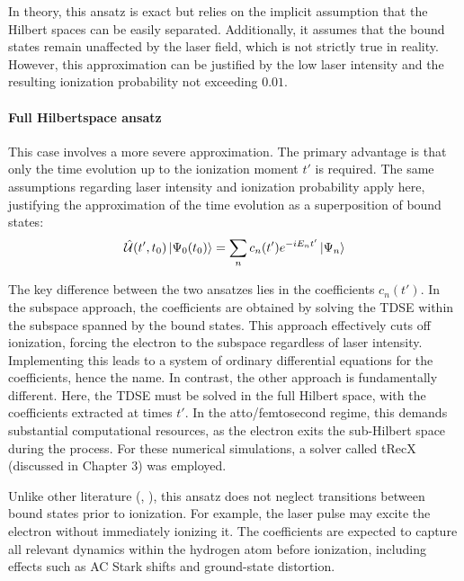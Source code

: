 In theory, this ansatz is exact but relies on the implicit assumption that the Hilbert spaces can be easily separated.
Additionally, it assumes that the bound states remain unaffected by the laser field, which is not strictly true in reality.
However, this approximation can be justified by the low laser intensity and the resulting ionization probability not exceeding $0.01$.

\paragraph{Full Hilbertspace ansatz}
This case involves a more severe approximation.
The primary advantage is that only the time evolution up to the ionization moment $t'$ is required.
The same assumptions regarding laser intensity and ionization probability apply here, justifying the approximation of the time evolution as a superposition of bound states:
\begin{equation*}
    \hat{\mathcal{U}}(t',t_0)\ket{\Psi_0(t_0)} = \sum_{n}c_n(t')e^{-iE_nt'}\ket{\Psi_n}
\end{equation*}

\bigskip

The key difference between the two ansatzes lies in the coefficients $c_n(t')$.
In the subspace approach, the coefficients are obtained by solving the TDSE within the subspace spanned by the bound states.
This approach effectively cuts off ionization, forcing the electron to the subspace regardless of laser intensity.
Implementing this leads to a system of ordinary differential equations for the coefficients, hence the name.
In contrast, the other approach is fundamentally different.
Here, the TDSE must be solved in the full Hilbert space, with the coefficients extracted at times $t'$.
In the atto/femtosecond regime, this demands substantial computational resources, as the electron exits the sub-Hilbert space during the process.
For these numerical simulations, a solver called tRecX (discussed in Chapter 3) was employed.

Unlike other literature (\cite{Theory_NPS}, \cite{Ivanov20012005}), this ansatz does not neglect transitions between bound states prior to ionization.
For example, the laser pulse may excite the electron without immediately ionizing it.
The coefficients are expected to capture all relevant dynamics within the hydrogen atom before ionization, including effects such as AC Stark shifts and ground-state distortion.

